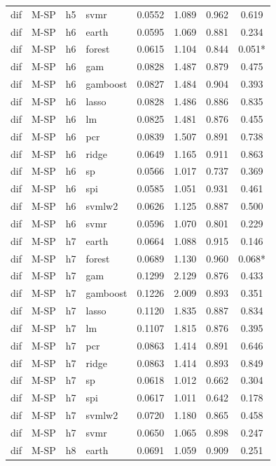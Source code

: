 \begin{ThreePartTable}
\begin{longtable}[t]{llclcccc}
dif & M-SP & h5 & svmr & 0.0552 & 1.089 & 0.962 & 0.619\\
\addlinespace
dif & M-SP & h6 & earth & 0.0595 & 1.069 & 0.881 & 0.234\\
dif & M-SP & h6 & forest & 0.0615 & 1.104 & 0.844 & 0.051*\\
dif & M-SP & h6 & gam & 0.0828 & 1.487 & 0.879 & 0.475\\
dif & M-SP & h6 & gamboost & 0.0827 & 1.484 & 0.904 & 0.393\\
dif & M-SP & h6 & lasso & 0.0828 & 1.486 & 0.886 & 0.835\\
dif & M-SP & h6 & lm & 0.0825 & 1.481 & 0.876 & 0.455\\
dif & M-SP & h6 & pcr & 0.0839 & 1.507 & 0.891 & 0.738\\
dif & M-SP & h6 & ridge & 0.0649 & 1.165 & 0.911 & 0.863\\
dif & M-SP & h6 & sp & 0.0566 & 1.017 & 0.737 & 0.369\\
dif & M-SP & h6 & spi & 0.0585 & 1.051 & 0.931 & 0.461\\
dif & M-SP & h6 & svmlw2 & 0.0626 & 1.125 & 0.887 & 0.500\\
dif & M-SP & h6 & svmr & 0.0596 & 1.070 & 0.801 & 0.229\\
\addlinespace
dif & M-SP & h7 & earth & 0.0664 & 1.088 & 0.915 & 0.146\\
dif & M-SP & h7 & forest & 0.0689 & 1.130 & 0.960 & 0.068*\\
dif & M-SP & h7 & gam & 0.1299 & 2.129 & 0.876 & 0.433\\
dif & M-SP & h7 & gamboost & 0.1226 & 2.009 & 0.893 & 0.351\\
dif & M-SP & h7 & lasso & 0.1120 & 1.835 & 0.887 & 0.834\\
dif & M-SP & h7 & lm & 0.1107 & 1.815 & 0.876 & 0.395\\
dif & M-SP & h7 & pcr & 0.0863 & 1.414 & 0.891 & 0.646\\
dif & M-SP & h7 & ridge & 0.0863 & 1.414 & 0.893 & 0.849\\
dif & M-SP & h7 & sp & 0.0618 & 1.012 & 0.662 & 0.304\\
dif & M-SP & h7 & spi & 0.0617 & 1.011 & 0.642 & 0.178\\
dif & M-SP & h7 & svmlw2 & 0.0720 & 1.180 & 0.865 & 0.458\\
dif & M-SP & h7 & svmr & 0.0650 & 1.065 & 0.898 & 0.247\\
\addlinespace
dif & M-SP & h8 & earth & 0.0691 & 1.059 & 0.909 & 0.251\\

\end{longtable}
\end{ThreePartTable}
